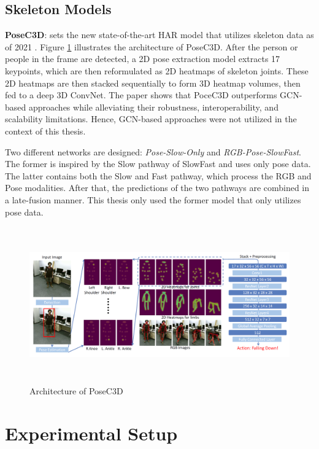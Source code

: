\documentclass[extern,palatino]{cgMA}
\begin{document}
\subsection{Skeleton Models}
\label{skeleton_models}
\noindent\textbf{PoseC3D}: sets the new state-of-the-art HAR model that utilizes skeleton data as of 2021 \cite{duan2021revisiting}. Figure \ref{posec3d_architecture} illustrates the architecture of PoseC3D. After the person or people in the frame are detected, a 2D pose extraction model extracts 17 keypoints, which are then reformulated as 2D heatmaps of skeleton joints. These 2D heatmaps are then stacked sequentially to form 3D heatmap volumes, then fed to a deep 3D ConvNet. The paper shows that PoceC3D outperforms GCN-based approaches while alleviating their robustness, interoperability, and scalability limitations. Hence, GCN-based approaches were not utilized in the context of this thesis.

\bigskip
\noindent Two different networks are designed: \textit{Pose-Slow-Only} and \textit{RGB-Pose-SlowFast}. The former is inspired by the Slow pathway of SlowFast and uses only pose data. The latter contains both the Slow and Fast pathway, which process the RGB and Pose modalities. After that, the predictions of the two pathways are combined in a late-fusion manner. This thesis only used the former model that only utilizes pose data.

\begin{figure}[h]
\center
\includegraphics[height={190pt}, width={440pt}]{images/posec3d_architecture.png}
\caption{Architecture of PoseC3D \cite{duan2021revisiting}}
\label{posec3d_architecture}
\end{figure}

\newpage
\section{Experimental Setup}
\label{experimental_setup}
\end{document}
